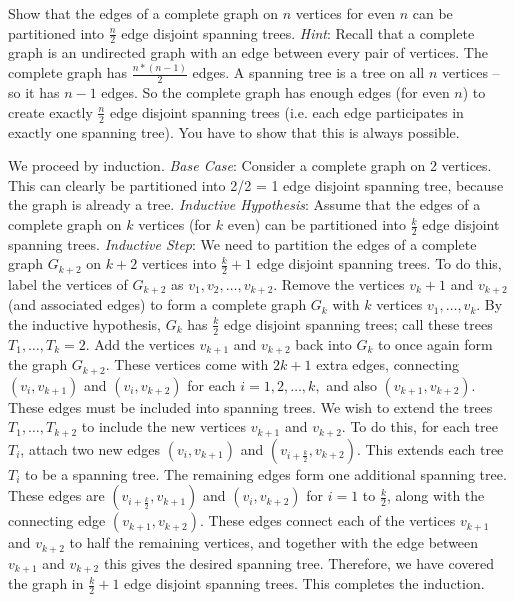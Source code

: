 \question Show that the edges of a complete graph on $n$ vertices 
for even $n$ can be partitioned into $\frac{n}{2}$ edge disjoint 
spanning trees. \newline
\textit{Hint}: Recall that a complete graph is an undirected graph 
with an edge between every pair of vertices. The complete graph has 
$\frac{n * (n-1)}{2}$ edges. A spanning tree is a tree on all $n$ 
vertices -- so it has $n-1$ edges. So the complete graph has enough 
edges (for even $n$) to create exactly $\frac{n}{2}$ edge disjoint 
spanning trees (i.e. each edge participates in exactly one spanning 
tree). You have to show that this is always possible.

\begin{solution}[5in]
We proceed by induction.\newline
\textit{Base Case}: Consider a complete graph on 2 vertices. This 
can clearly be partitioned into 2/2 = 1 edge disjoint spanning tree, 
because the graph is already a tree.\newline
\textit{Inductive Hypothesis}: Assume that the edges of a complete 
graph on $k$ vertices (for $k$ even) can be partitioned into 
$\frac{k}{2}$ edge disjoint spanning trees.\newline
\textit{Inductive Step}: We need to partition the edges of a 
complete graph $G_{k+2}$ on $k+2$ vertices into $\frac{k}{2} +1$ 
edge disjoint spanning trees.\newline
To do this, label the vertices of $G_{k+2}$ as $v_1, v_2, \dotsc ,v_{k+2}$. 
Remove the vertices $v_k+1$ and $v_{k+2}$ (and associated edges) to 
form a complete graph $G_k$ with $k$ vertices $v_1, \dotsc, v_k$. 
By the inductive hypothesis, $G_k$ has $\frac{k}{2}$ edge disjoint 
spanning trees; call these trees $T_1, \dotsc ,T_k=2$.
Add the vertices $v_{k+1}$ and $v_{k+2}$ back into $G_k$ to once 
again form the graph $G_{k+2}$. These vertices come with $2k+1$ 
extra edges, connecting $(v_i,v_{k+1})$ and $(v_i,v_{k+2})$ for 
each $i = 1,2,\dotsc,k,$ and also
$(v_{k+1}, v_{k+2})$. These edges must be included into spanning trees.
We wish to extend the trees $T_1,\dotsc,T_{k+2}$ to include the new 
vertices $v_{k+1}$ and $v_{k+2}$. To do this, for each tree $T_i$, 
attach two new edges $(v_i,v_{k+1})$ and $(v_{i+\frac{k}{2}}, v_{k+2})$. 
This extends each tree $T_i$ to be a spanning tree.
The remaining edges form one additional spanning tree. These edges 
are $(v_{i+\frac{k}{2}}, v_{k+1})$ and $(v_i,v_{k+2})$ for $i =1$ to 
$\frac{k}{2}$, along with the connecting edge $(v_{k+1}, v_{k+2})$. 
These edges connect each of the vertices $v_{k+1}$ and $v_{k+2}$ to 
half the remaining vertices, and together with the edge between 
$v_{k+1}$ and $v_{k+2}$ this gives the desired spanning tree.
Therefore, we have covered the graph in $\frac{k}{2} +1$ edge disjoint 
spanning trees. This completes the induction.\newline


\end{solution}
